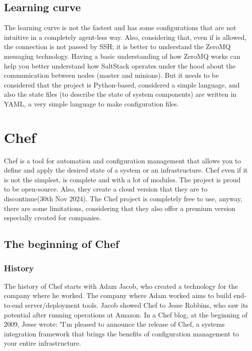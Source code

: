 \documentclass[12pt,a4paper,openright,twoside]{book}
\begin{document}
\section{Learning curve}
The learning curve is not the fastest and has some configurations that are not intuitive in a completely agent-less way.
Also, considering that, even if is allowed, the connection is not passed by SSH; it is better to understand the ZeroMQ messaging technology.
Having a basic understanding of how ZeroMQ works can help you better understand how SaltStack operates under the hood about the communication between nodes (master and minions).
But it needs to be considered that the project is Python-based, considered a simple language, and also the state files (to describe the state of system components) are written in YAML, a very simple language to make configuration files.

\chapter{Chef}
Chef is a tool for automation and configuration management that allows you to define and apply the desired state of a system or an infrastructure.
Chef even if it is not the simplest, is complete and with a lot of modules. The project is proud to be open-source.
Also, they create a cloud version that they are to discontinue(30th Nov 2024).
The Chef project is completely free to use, anyway, there are some limitations, considering that they also offer a premium version especially created for companies.

\section{The beginning of Chef}

\subsection{History}
The history of Chef starts with Adam Jacob, who created a technology for the company where he worked.
The company where Adam worked aims to build end-to-end server/deployment tools. Jacob showed Chef to Jesse Robbins, who saw its potential after running operations at Amazon.
In a Chef blog, at the beginning of 2009, Jesse wrote:
"I'm pleased to announce the release of Chef, a systems integration framework that brings the benefits of configuration management to your entire infrastructure.
\end{document}
